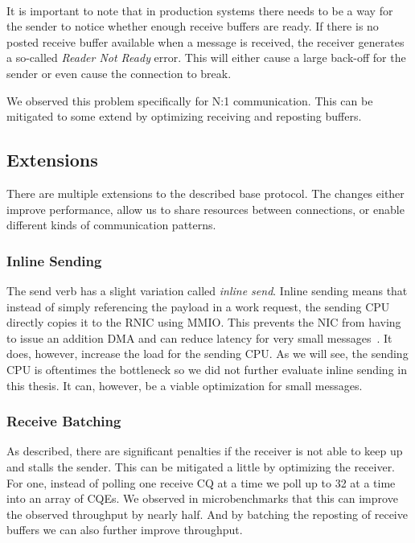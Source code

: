 \paragraph{} It is important to note that in production systems there needs to be a way for the sender to notice whether 
enough receive buffers are ready. If there is no posted receive buffer available when a message is received,
the receiver  generates
a so-called \emph{Reader Not Ready} error. This will either cause a large back-off for the sender 
or even cause the connection
to break.

We observed this problem specifically for N:1 communication. This can be mitigated to some extend by optimizing receiving and
reposting buffers.




\subsection{Extensions}

There are multiple extensions to the described base protocol. The changes either improve performance, allow us to
share resources between connections, or enable different kinds of communication patterns.

\subsubsection{Inline Sending}
The send verb has a slight variation called \emph{inline send}. Inline sending means that instead of 
simply referencing the payload in a work request, the sending CPU directly copies it to the RNIC using MMIO. This prevents
the NIC from having to issue an addition DMA and can reduce latency for very small messages~\cite{anuj-guide}. It does,
however,
increase the load for the sending CPU. As we will see, the sending CPU is oftentimes the bottleneck so we did not further 
evaluate inline sending in this thesis. It can, however, be a viable optimization for small messages.


\subsubsection{Receive Batching} 
As described, there are significant penalties if the receiver is not able to keep up and stalls the sender.
This can be mitigated a little by optimizing the receiver. For one, instead of polling one receive CQ at a time we poll up to 32
at a time into an array of CQEs. We observed in microbenchmarks that this can improve the observed throughput by nearly half.
And by batching the reposting of receive buffers we can also further improve throughput.

